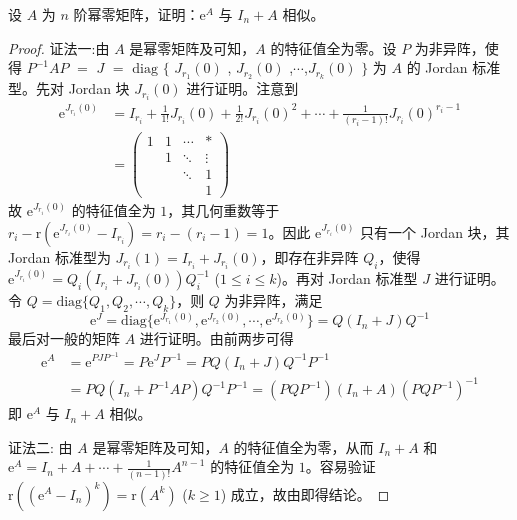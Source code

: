 \documentclass[../../main.tex]{subfiles}
\begin{document}
\begin{proposition}\label{proposition:e^A与I_n+A相似}
设 $A$ 为 $n$ 阶幂零矩阵，证明：$\mathrm{e}^A$ 与 $I_n + A$ 相似。
\end{proposition}
\begin{proof}
{\color{blue}证法一:}由 $A$ 是幂零矩阵及可知，$A$ 的特征值全为零。设 $P$ 为非异阵，使得 $P^{-1}AP$ $=$ $J$ $=$ $\mathrm{diag}$ $\{$ $J_{r_1}(0)$ , $J_{r_2}(0)$ ,$\cdots$,$J_{r_k}(0)$ $\}$ 为 $A$ 的 Jordan 标准型。先对 Jordan 块 $J_{r_i}(0)$ 进行证明。注意到
\begin{align*}
\mathrm{e}^{J_{r_i}(0)} &= I_{r_i}+\frac{1}{1!}J_{r_i}(0)+\frac{1}{2!}J_{r_i}(0)^2+\cdots+\frac{1}{(r_i - 1)!}J_{r_i}(0)^{r_i - 1}\\
&= 
\begin{pmatrix}
1 & 1 & \cdots & * \\
& 1 & \ddots & \vdots \\
& & \ddots & 1 \\
& & & 1
\end{pmatrix}
\end{align*}
故 $\mathrm{e}^{J_{r_i}(0)}$ 的特征值全为 $1$，其几何重数等于 $r_i - \mathrm{r}(\mathrm{e}^{J_{r_i}(0)}-I_{r_i}) = r_i - (r_i - 1) = 1$。因此 $\mathrm{e}^{J_{r_i}(0)}$ 只有一个 Jordan 块，其 Jordan 标准型为 $J_{r_i}(1) = I_{r_i}+J_{r_i}(0)$，即存在非异阵 $Q_i$，使得 $\mathrm{e}^{J_{r_i}(0)} = Q_i(I_{r_i}+J_{r_i}(0))Q_i^{-1}$ ($1\leqslant  i\leqslant  k$)。再对 Jordan 标准型 $J$ 进行证明。令 $Q = \mathrm{diag}\{Q_1,Q_2,\cdots,Q_k\}$，则 $Q$ 为非异阵，满足
\[
\mathrm{e}^J = \mathrm{diag}\{\mathrm{e}^{J_{r_1}(0)},\mathrm{e}^{J_{r_2}(0)},\cdots,\mathrm{e}^{J_{r_k}(0)}\} = Q(I_n + J)Q^{-1}
\]
最后对一般的矩阵 $A$ 进行证明。由前两步可得
\begin{align*}
\mathrm{e}^A &= \mathrm{e}^{PJP^{-1}} = P\mathrm{e}^JP^{-1} = PQ(I_n + J)Q^{-1}P^{-1}\\
&= PQ(I_n + P^{-1}AP)Q^{-1}P^{-1} = (PQP^{-1})(I_n + A)(PQP^{-1})^{-1}
\end{align*}
即 $\mathrm{e}^A$ 与 $I_n + A$ 相似。

{\color{blue}证法二:}
由 $A$ 是幂零矩阵及可知，$A$ 的特征值全为零，从而 $I_n + A$ 和 $\mathrm{e}^A = I_n+A+\cdots+\frac{1}{(n - 1)!}A^{n - 1}$ 的特征值全为 $1$。容易验证 $\mathrm{r}((\mathrm{e}^A - I_n)^k) = \mathrm{r}(A^k)$ ($k\geqslant  1$) 成立，故由即得结论。

\end{proof}
\end{document}
